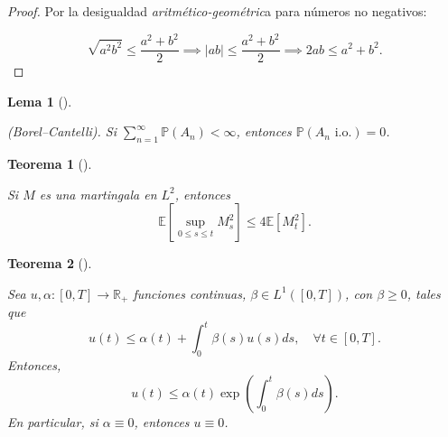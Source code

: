 \documentclass[
  spanish,
  us-letterpaper,
]{scrreprt}
\theoremstyle{plain}
\newtheorem{theorem}{Teorema}[chapter]
\theoremstyle{plain}
\newtheorem{lemma}{Lema}[chapter]
\theoremstyle{definition}
\theoremstyle{remark}
\begin{document}
\begin{proof}
Por la desigualdad \emph{aritmético-geométric}a para números no
negativos:

\[\sqrt{a^2 b^2} \leq \frac{a^2 + b^2}{2} \implies |ab| \leq \frac{a^2 + b^2}{2} \implies 2ab \leq a^2 + b^2.\]
\end{proof}

\begin{lemma}[]\protect\hypertarget{lem-Borel_cantelli}{}\label{lem-Borel_cantelli}

(Borel--Cantelli). Si \(\sum_{n=1}^\infty \mathbb{P}(A_n) < \infty\),
entonces \(\mathbb{P}(A_n \text{ i.o.}) = 0\).

\end{lemma}

\begin{theorem}[]\protect\hypertarget{thm-Des_Doob}{}\label{thm-Des_Doob}

Si \(M\) es una martingala en \(L^2\), entonces
\[\mathbb{E}\left[ \sup_{0 \leq s \leq t} M_s^2 \right] \leq 4 \mathbb{E}[M_t^2].\]

\end{theorem}

\begin{theorem}[]\protect\hypertarget{thm-Desigualdad_Grönwall}{}\label{thm-Desigualdad_Grönwall}

Sea \(u, \alpha: [0,T] \to \mathbb{R}_{+}\) funciones continuas,
\(\beta \in L^1([0,T])\), con \(\beta \geq 0\), tales que
\[u(t) \leq \alpha(t) + \int_0^t \beta(s) u(s) ds, \quad \forall t \in [0,T].\]
Entonces,
\[u(t) \leq \alpha(t) \exp\left( \int_0^t \beta(s) ds \right).\] En
particular, si \(\alpha \equiv 0\), entonces \(u \equiv 0\).

\end{theorem}
\end{document}
